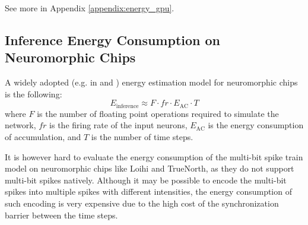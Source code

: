         See more in Appendix \ref{appendix:energy_gpu}.

    \subsection{Inference Energy Consumption on Neuromorphic Chips}
    \label{subsec:inference_energy}
        A widely adopted (e.g. in \cite{zhu2024spikegptgenerativepretrainedlanguage} and \cite{chen2024deepreinforcementlearningspiking}) energy estimation model for neuromorphic chips is the following:
        \begin{equation}
            \label{eq:inference_energy_popular}
            E_{\text{inference}} \approx F \cdot fr \cdot E_{\text{AC}} \cdot T
        \end{equation}
        where $F$ is the number of floating point operations required to simulate the network, $fr$ is the firing rate of the input neurons, $E_{\text{AC}}$ is the energy consumption of accumulation, and $T$ is the number of time steps. 
    
        It is however hard to evaluate the energy consumption of the multi-bit spike train model on neuromorphic chips like Loihi and TrueNorth, as they do not support multi-bit spikes natively. Although it may be possible to encode the multi-bit spikes into multiple spikes with different intensities, the energy consumption of such encoding is very expensive due to the high cost of the synchronization barrier between the time steps. 

